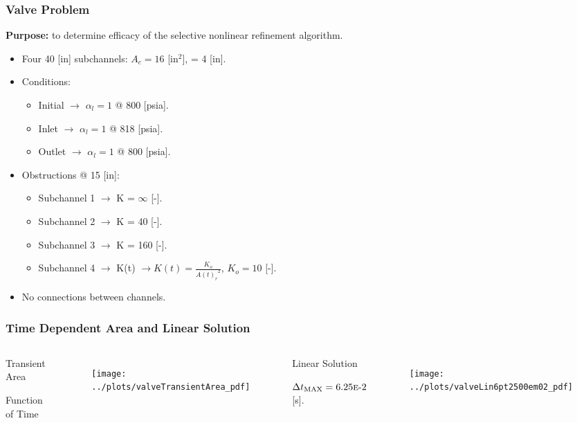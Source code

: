 \documentclass[compress,xcolor=table]{beamer}
\newlength{\hpw}
\begin{document}
\begin{frame}
\frametitle{Valve Problem}

\textbf{Purpose:} to determine efficacy of the selective nonlinear refinement algorithm.

\begin{itemize}
\item{Four 40 [in] subchannels: $A_{c} = 16$ [in$^{2}$], \dx{} = 4 [in].}
\item{Conditions:
	\begin{itemize}
	\item{Initial $\rightarrow$ $\alpha_{l} = 1$ @ 800 [psia].}
	\item{Inlet $\rightarrow$ $\alpha_{l} = 1$ @ 818 [psia].}
	\item{Outlet $\rightarrow$ $\alpha_{l} = 1$ @ 800 [psia].}
	\end{itemize}
}
\item{Obstructions @ 15 [in]:
\begin{itemize}
	\item{Subchannel 1 $\rightarrow$ K = $\infty$ [-].}
	\item{Subchannel 2 $\rightarrow$ K = 40 [-].}
	\item{Subchannel 3 $\rightarrow$ K = 160 [-].}
	\item{Subchannel 4 $\rightarrow$ K(t) $\rightarrow K(t) = \frac{K_{o}}{{A(t)_r}^2}$, $K_{o} = 10$ [-].}
\end{itemize}
}
\item{No connections between channels.}
\end{itemize}

\end{frame}
\begin{frame}
\frametitle{Time Dependent Area and Linear Solution}

\begin{columns}

\column{\hpw}
\begin{center}
Transient Area

Function of Time
\end{center}
\begin{figure}[h!t]
\centering
\texttt{[image: ../plots/valveTransientArea\_pdf]}
\end{figure}

\column{\hpw}
\begin{center}
Linear Solution

$\dtmax{}=\expneg{6.25}{2}$ [s].
\end{center}
\begin{figure}[h!t]
\centering
\texttt{[image: ../plots/valveLin6pt2500em02\_pdf]}
\end{figure}


\end{columns}

\end{frame}
\end{document}
